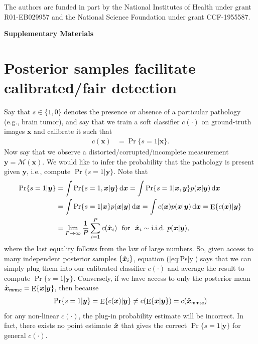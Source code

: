 \documentclass{article}
\theoremstyle{plain}
\theoremstyle{definition}
\theoremstyle{remark}
\newcommand{\hvec}[1]{\ensuremath{\Hat{\boldsymbol{#1}}}}
\renewcommand{\vec}[1]{\ensuremath{\boldsymbol{#1}}}
\newcommand{\mc}[1]{\ensuremath{\mathcal{#1}}}
\newcommand*\deriv{\mathop{}\!\mathrm{d}}
\DeclareMathOperator{\E}{E}
\renewcommand{\eqref}[1]{(\ref{eq:#1})}
\newcommand{\mmse}{_{\mathsf{mmse}}}
\begin{document}
\begin{ack}
The authors are funded in part by the National Institutes of Health under grant R01-EB029957 and the National Science Foundation under grant CCF-1955587. 
\end{ack}


\small

\normalsize

\clearpage
\appendix
{}
\begin{center}
\Large \bf Supplementary Materials
\end{center}

\section{Posterior samples facilitate calibrated/fair detection} \label{app:detection}

Say that $s\in\{1,0\}$ denotes the presence or absence of a particular pathology (e.g., brain tumor), and say that we train a soft classifier $c(\cdot)$ on ground-truth images $\vec{x}$ and calibrate it such that
\begin{align}
c(\vec{x})
&= \Pr\{s=1|\vec{x}\} 
\label{eq:classifier}.
\end{align}
Now say that we observe a distorted/corrupted/incomplete measurement $\vec{y}=\mc{M}(\vec{x})$.
We would like to infer the probability that the pathology is present given $\vec{y}$, i.e., compute $\Pr\{s=1|\vec{y}\}$.
Note that 
\begin{align}
\Pr\{s=1|\vec{y}\}
&= \int \Pr\{s=1,\vec{x}|\vec{y}\} \deriv\vec{x}
= \int \Pr\{s=1|\vec{x},\vec{y}\} p(\vec{x}|\vec{y}) \deriv\vec{x} \\
&= \int \Pr\{s=1|\vec{x}\} p(\vec{x}|\vec{y}) \deriv\vec{x} 
= \int c(\vec{x}) p(\vec{x}|\vec{y}) \deriv\vec{x}
= \E\{c(\vec{x})|\vec{y}\} \\
&= \lim_{P\rightarrow\infty} \frac{1}{P}\sum_{i=1}^P c(\hvec{x}_i)
\text{~~for~~} \hvec{x}_i\sim\text{i.i.d.~} p(\vec{x}|\vec{y})
\label{eq:Ps|y},
\end{align}
where the last equality follows from the law of large numbers.
So, given access to many independent posterior samples $\{\hvec{x}_i\}$, equation \eqref{Ps|y} says that we can simply plug them into our calibrated classifier $c(\cdot)$ and average the result to compute $\Pr\{s=1|\vec{y}\}$.
%
Conversely, if we have access to only the posterior mean $\hvec{x}\mmse = \E\{\vec{x}|\vec{y}\}$, then because
\begin{align}
\Pr\{s=1|\vec{y}\}
= \E\{c(\vec{x})|\vec{y}\}
\neq c(\E\{\vec{x}|\vec{y}\})
= c(\hvec{x}\mmse)
\end{align}
for any non-linear $c(\cdot)$, the plug-in probability estimate will be incorrect.
In fact, there exists no point estimate $\hvec{x}$ that gives the correct $\Pr\{s=1|\vec{y}\}$ for general $c(\cdot)$.
\end{document}
